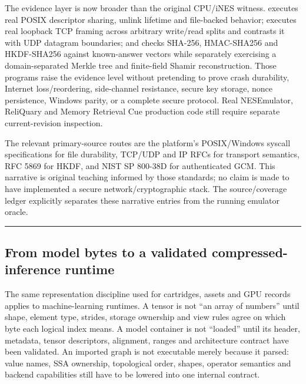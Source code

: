 The evidence layer is now broader than the original CPU/iNES witness.  executes real POSIX descriptor sharing, unlink lifetime and file-backed  behavior;  executes real loopback TCP framing across arbitrary write/read splits and contrasts it with UDP datagram boundaries; and  checks SHA-256, HMAC-SHA256 and HKDF-SHA256 against known-answer vectors while separately exercising a domain-separated Merkle tree and finite-field Shamir reconstruction. Those programs raise the evidence level without pretending to prove crash durability, Internet loss/reordering, side-channel resistance, secure key storage, nonce persistence, Windows parity, or a complete secure protocol. Real NESEmulator, ReliQuary and Memory Retrieval Cue production code still require separate current-revision inspection.

The relevant primary-source routes are the platform's POSIX/Windows syscall specifications for file durability, TCP/UDP and IP RFCs for transport semantics, RFC 5869 for HKDF, and NIST SP 800-38D for authenticated GCM. This narrative is original teaching informed by those standards; no claim is made to have implemented a secure network/cryptographic stack. The source/coverage ledger explicitly separates these narrative entries from the running emulator oracle.

\begin{center}\rule{0.5\linewidth}{0.5pt}\end{center}

\subsection{From model bytes to a validated compressed-inference runtime}\label{01-foundations-i-ch017-from-model-bytes-to-a-validated-compressed-inference-runtime}

\hypertarget{01-foundations-i-ch017-from-model-bytes-to-a-validated-compressed-inference-runtime}{}

The same representation discipline used for cartridges, assets and GPU records applies to machine-learning runtimes. A tensor is not ``an array of numbers'' until shape, element type, strides, storage ownership and view rules agree on which byte each logical index means. A model container is not ``loaded'' until its header, metadata, tensor descriptors, alignment, ranges and architecture contract have been validated. An imported graph is not executable merely because it parsed: value names, SSA ownership, topological order, shapes, operator semantics and backend capabilities still have to be lowered into one internal contract.

